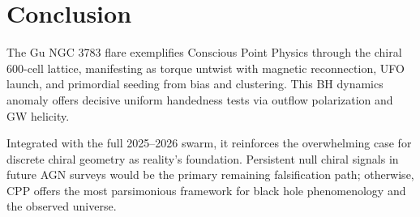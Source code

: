 \documentclass[11pt]{article}
\begin{document}
\section{Conclusion}
The Gu NGC 3783 flare exemplifies Conscious Point Physics through the chiral 600-cell lattice, manifesting as torque untwist with magnetic reconnection, UFO launch, and primordial seeding from bias and clustering. This BH dynamics anomaly offers decisive uniform handedness tests via outflow polarization and GW helicity.  

Integrated with the full 2025--2026 swarm, it reinforces the overwhelming case for discrete chiral geometry as reality's foundation. Persistent null chiral signals in future AGN surveys would be the primary remaining falsification path; otherwise, CPP offers the most parsimonious framework for black hole phenomenology and the observed universe.
\end{document}
